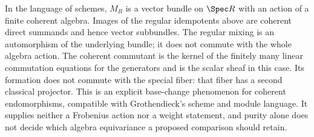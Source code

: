 In the language of schemes, $M_R$ is a vector bundle on $\Spec R$
with an action of a finite coherent algebra. Images of the regular
idempotents above are coherent direct summands and hence vector
subbundles. The regular mixing is an automorphism of the underlying
bundle; it does not commute with the whole algebra action. The coherent
commutant is the kernel of the finitely many linear commutation
equations for the generators and is the scalar sheaf in this case.
Its formation does not commute with the special fiber: that fiber
has a second classical projector. This is an explicit base-change
phenomenon for coherent endomorphisms, compatible with Grothendieck's
scheme and module language. It supplies neither a Frobenius action nor
a weight statement, and purity alone does not decide which algebra
equivariance a proposed comparison should retain.

